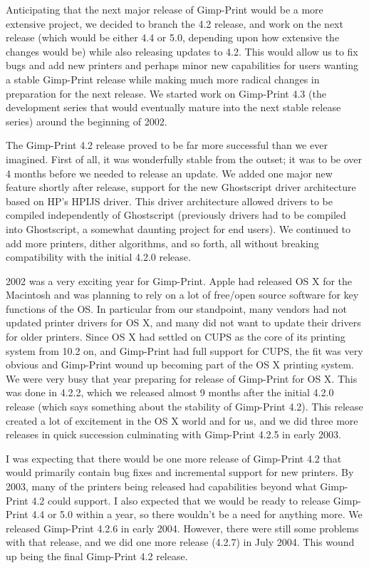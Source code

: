 \documentclass{article}[letter]
\begin{document}
Anticipating that the next major release of Gimp-Print would be a more
extensive project, we decided to branch the 4.2 release, and work on
the next release (which would be either 4.4 or 5.0, depending upon how
extensive the changes would be) while also releasing updates to 4.2.
This would allow us to fix bugs and add new printers and perhaps minor
new capabilities for users wanting a stable Gimp-Print release while
making much more radical changes in preparation for the next
release. We started work on Gimp-Print 4.3 (the development series
that would eventually mature into the next stable release series)
around the beginning of 2002.

The Gimp-Print 4.2 release proved to be far more successful than we
ever imagined. First of all, it was wonderfully stable from the
outset; it was to be over 4 months before we needed to release an
update. We added one major new feature shortly after release, support
for the new Ghostscript driver architecture based on HP's HPIJS
driver. This driver architecture allowed drivers to be compiled
independently of Ghostscript (previously drivers had to be compiled
into Ghostscript, a somewhat daunting project for end users). We
continued to add more printers, dither algorithms, and so forth, all
without breaking compatibility with the initial 4.2.0 release.

2002 was a very exciting year for Gimp-Print. Apple had released OS X
for the Macintosh and was planning to rely on a lot of free/open
source software for key functions of the OS. In particular from our
standpoint, many vendors had not updated printer drivers for OS X, and
many did not want to update their drivers for older printers. Since OS
X had settled on CUPS as the core of its printing system from 10.2 on,
and Gimp-Print had full support for CUPS, the fit was very obvious and
Gimp-Print wound up becoming part of the OS X printing system. We were
very busy that year preparing for release of Gimp-Print for OS X. This
was done in 4.2.2, which we released almost 9 months after the initial
4.2.0 release (which says something about the stability of Gimp-Print
4.2). This release created a lot of excitement in the OS X world and
for us, and we did three more releases in quick succession culminating
with Gimp-Print 4.2.5 in early 2003.

I was expecting that there would be one more release of Gimp-Print 4.2
that would primarily contain bug fixes and incremental support for new
printers. By 2003, many of the printers being released had
capabilities beyond what Gimp-Print 4.2 could support. I also expected
that we would be ready to release Gimp-Print 4.4 or 5.0 within a year,
so there wouldn't be a need for anything more. We released Gimp-Print
4.2.6 in early 2004. However, there were still some problems with that
release, and we did one more release (4.2.7) in July 2004. This wound
up being the final Gimp-Print 4.2 release.
\end{document}
